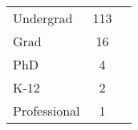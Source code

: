 \begin{table}[ht]
\begin{tabular}{l c p{4cm}}
		Undergrad & 113 \\
		Grad & 16 \\
		PhD & 4 \\
		K-12 & 2 \\
		Professional & 1 \\
	\bottomrule
    \end{tabular}
    \label{tab:edu_level}
\end{table}